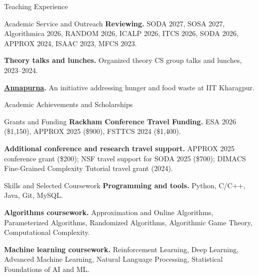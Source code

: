 \documentclass{resume_cv}
\begin{document}
\begin{rSection}{Teaching Experience}
\end{rSection}

\begin{rSection}{Academic Service and Outreach}
\textbf{Reviewing.} SODA 2027, SOSA 2027, Algorithmica 2026, RANDOM 2026, ICALP 2026, ITCS 2026, SODA 2026, APPROX 2024, ISAAC 2023, MFCS 2023.\par\vspace{3pt}
\textbf{Theory talks and lunches.} Organized theory CS group talks and lunches, 2023--2024.\par\vspace{3pt}
\textbf{\href{https://aaysharma.github.io/content/annapurna.html}{Annapurna}.} An initiative addressing hunger and food waste at IIT Kharagpur.
\end{rSection}

\begin{rSection}{Academic Achievements and Scholarships}
\end{rSection}

\begin{rSection}{Grants and Funding}
\textbf{Rackham Conference Travel Funding.} ESA 2026 (\$1,150), APPROX 2025 (\$900), FSTTCS 2024 (\$1,400).\par\vspace{3pt}
\textbf{Additional conference and research travel support.} APPROX 2025 conference grant (\$200); NSF travel support for SODA 2025 (\$700); DIMACS Fine-Grained Complexity Tutorial travel grant (2024).
\end{rSection}

\begin{rSection}{Skills and Selected Coursework}
\textbf{Programming and tools.} Python, C/C++, Java, Git, MySQL.\par\vspace{3pt}
\textbf{Algorithms coursework.} Approximation and Online Algorithms, Parameterized Algorithms, Randomized Algorithms, Algorithmic Game Theory, Computational Complexity.\par\vspace{3pt}
\textbf{Machine learning coursework.} Reinforcement Learning, Deep Learning, Advanced Machine Learning, Natural Language Processing, Statistical Foundations of AI and ML.
\end{rSection}
\end{document}
